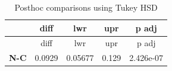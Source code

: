 \documentclass[]{article}
\begin{document}
\begin{longtable}[]{@{}ccccc@{}}
\caption{Posthoc comparisons using Tukey HSD}\tabularnewline
\toprule
\begin{minipage}[b]{0.13\columnwidth}\centering\strut
~
\strut\end{minipage} &
\begin{minipage}[b]{0.11\columnwidth}\centering\strut
diff
\strut\end{minipage} &
\begin{minipage}[b]{0.12\columnwidth}\centering\strut
lwr
\strut\end{minipage} &
\begin{minipage}[b]{0.11\columnwidth}\centering\strut
upr
\strut\end{minipage} &
\begin{minipage}[b]{0.11\columnwidth}\centering\strut
p adj
\strut\end{minipage}\tabularnewline
\midrule
\endfirsthead
\toprule
\begin{minipage}[b]{0.13\columnwidth}\centering\strut
~
\strut\end{minipage} &
\begin{minipage}[b]{0.11\columnwidth}\centering\strut
diff
\strut\end{minipage} &
\begin{minipage}[b]{0.12\columnwidth}\centering\strut
lwr
\strut\end{minipage} &
\begin{minipage}[b]{0.11\columnwidth}\centering\strut
upr
\strut\end{minipage} &
\begin{minipage}[b]{0.11\columnwidth}\centering\strut
p adj
\strut\end{minipage}\tabularnewline
\midrule
\endhead
\begin{minipage}[t]{0.13\columnwidth}\centering\strut
\textbf{N-C}
\strut\end{minipage} &
\begin{minipage}[t]{0.11\columnwidth}\centering\strut
0.0929
\strut\end{minipage} &
\begin{minipage}[t]{0.12\columnwidth}\centering\strut
0.05677
\strut\end{minipage} &
\begin{minipage}[t]{0.11\columnwidth}\centering\strut
0.129
\strut\end{minipage} &
\begin{minipage}[t]{0.11\columnwidth}\centering\strut
2.426e-07
\strut\end{minipage}\tabularnewline

\end{longtable}
\end{document}
